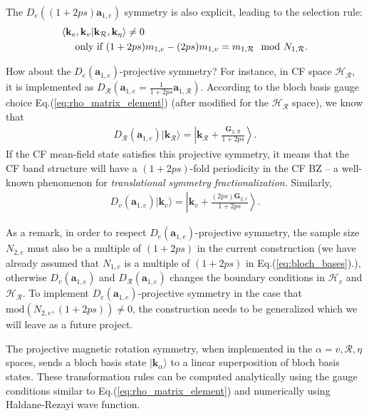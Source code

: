 The $D_e((1+2ps)\mathbf a_{1,e})$ symmetry is also explicit, leading to the selection rule:
\begin{align}
&\langle \mathbf k_e,\mathbf k_v|\mathbf k_{\mathcal R},\mathbf k_{\eta} \rangle \neq 0 \notag\\
&\quad\text{ only if } (1+2ps)m_{1,e}-(2ps)m_{1,v}=m_{1,\mathcal R} \mod N_{1,\mathcal R}.\label{eq:CG_selection_1}
\end{align}

How about the $D_e(\mathbf a_{1,e})$-projective symmetry? For instance, in CF space $\mathcal H_{\mathcal R}$, it is implemented as $D_{\mathcal R}(\mathbf a_{1,e}=\frac{1}{1+2ps}\mathbf a_{1,\mathcal R})$. According to the bloch basis gauge choice Eq.(\ref{eq:rho_matrix_element}) (after modified for the $\mathcal H_{\mathcal R}$ space), we know that
\begin{align}\label{eq: translation fractionalization}
D_{\mathcal R}(\mathbf a_{1,e})|\mathbf k_{\mathcal R}\rangle=\left|\mathbf k_{\mathcal R}+\frac{\mathbf G_{2,\mathcal R}}{1+2ps}\right\rangle.
\end{align}
If the CF mean-field state satisfies this projective symmetry, it means that the CF band structure will have a $(1+2ps)$-fold periodicity in the CF BZ -- a well-known phenomenon for \emph{translational symmetry fractionalization}. Similarly,
\begin{align}
D_{v}(\mathbf a_{1,e})|\mathbf k_v\rangle=\left|\mathbf k_v+\frac{(2ps)\mathbf G_{2,v}}{1+2ps}\right\rangle.
\end{align}

As a remark, in order to respect $D_e(\mathbf a_{1,e})$-projective symmetry, the sample size $N_{2,e}$ must also be a multiple of $(1+2ps)$ in the current construction (we have already assumed that $N_{1,e}$ is a multiple of $(1+2ps)$ in Eq.(\ref{eq:bloch_bases}).), otherwise $D_v(\mathbf a_{1,e})$ and $D_{\mathcal R}(\mathbf a_{1,e})$ changes the boundary conditions in $\mathcal H_v$ and $\mathcal H_{\mathcal R}$. To implement $D_e(\mathbf a_{1,e})$-projective symmetry in the case that $\text{mod}(N_{2,e},(1+2ps))\neq 0$, the construction needs to be generalized which we will leave as a future project.

The projective magnetic rotation symmetry, when implemented in the $\alpha=v,\mathcal R,\eta$ spaces, sends a bloch basis state $|\mathbf k_\alpha\rangle$ to a linear superposition of bloch basis states. These transformation rules can be computed analytically using the gauge conditions similar to Eq.(\ref{eq:rho_matrix_element}) and numerically using Haldane-Rezayi wave function. 

